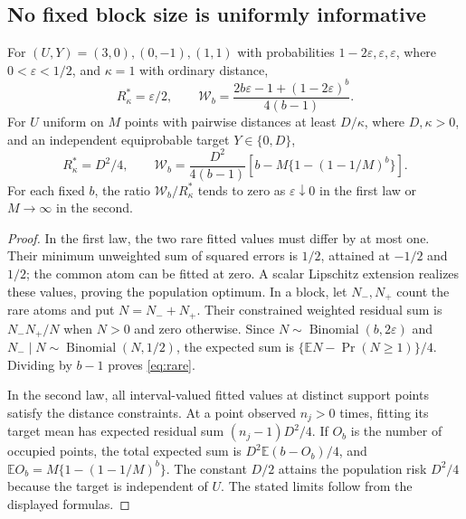 \subsection{No fixed block size is uniformly informative}

\begin{proposition}
\label{prop:limits}
For $(U,Y)=(3,0),(0,-1),(1,1)$ with probabilities
$1-2\varepsilon,\varepsilon,\varepsilon$, where
$0<\varepsilon<1/2$, and $\kappa=1$ with ordinary distance,
\begin{equation}
 R^*_\kappa=\varepsilon/2,
 \qquad
 \mathcal W_b=
 \frac{2b\varepsilon-1+(1-2\varepsilon)^b}{4(b-1)}.
 \label{eq:rare}
\end{equation}
For $U$ uniform on $M$ points with pairwise distances at least $D/\kappa$,
where $D,\kappa>0$, and an independent equiprobable target
$Y\in\{0,D\}$,
\begin{equation}
 R^*_\kappa=D^2/4,
 \qquad
 \mathcal W_b=\frac{D^2}{4(b-1)}
       \left[b-M\{1-(1-1/M)^b\}\right].
 \label{eq:occupancy}
\end{equation}
For each fixed $b$, the ratio $\mathcal W_b/R^*_\kappa$ tends to zero as
$\varepsilon\downarrow0$ in the first law or $M\to\infty$ in the second.
\end{proposition}

\begin{proof}
In the first law, the two rare fitted values must differ by at most one.
Their minimum unweighted sum of squared errors is $1/2$, attained at
$-1/2$ and $1/2$; the common atom can be fitted at zero. A scalar
Lipschitz extension realizes these values, proving the population optimum.
In a block, let $N_-,N_+$ count the rare atoms and put $N=N_-+N_+$.
Their constrained weighted residual sum is $N_-N_+/N$ when $N>0$ and
zero otherwise. Since $N\sim\operatorname{Binomial}(b,2\varepsilon)$ and
$N_-\mid N\sim\operatorname{Binomial}(N,1/2)$, the expected sum is
$\{\mathbb EN-\Pr(N\geq1)\}/4$. Dividing by $b-1$ proves
\eqref{eq:rare}.

In the second law, all interval-valued fitted values at distinct support
points satisfy the distance constraints. At a point observed $n_j>0$
times, fitting its target mean has expected residual sum
$(n_j-1)D^2/4$. If $O_b$ is the number of occupied points, the total
expected sum is $D^2\mathbb E(b-O_b)/4$, and
$\mathbb EO_b=M\{1-(1-1/M)^b\}$. The constant $D/2$ attains the
population risk $D^2/4$ because the target is independent of $U$.
The stated limits follow from the displayed formulas.
\end{proof}

